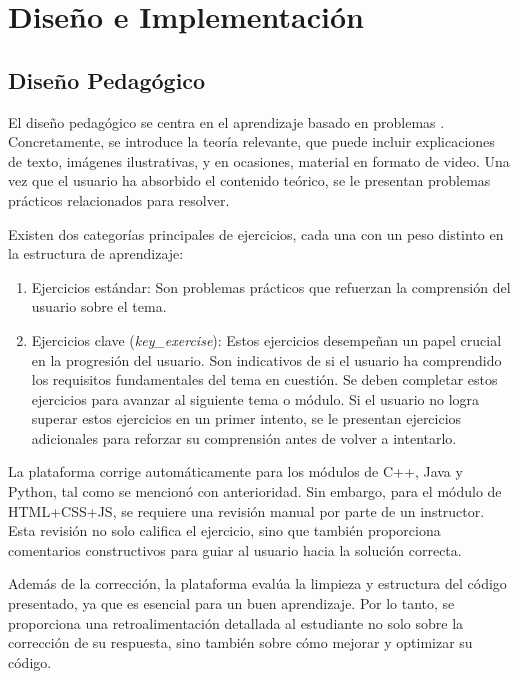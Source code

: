 \chapter{Diseño e Implementación} \label{chap:analisisExperimentación}


\section{Diseño Pedagógico}

El diseño pedagógico se centra en el aprendizaje basado en problemas \cite{de2008aprendizaje}. Concretamente, se introduce la teoría relevante, que puede incluir explicaciones de texto, imágenes ilustrativas, y en ocasiones, material en formato de video. Una vez que el usuario ha absorbido el contenido teórico, se le presentan problemas prácticos relacionados para resolver.

Existen dos categorías principales de ejercicios, cada una con un peso distinto en la estructura de aprendizaje:

\begin {enumerate}
\item Ejercicios estándar: Son problemas prácticos que refuerzan la comprensión del usuario sobre el tema.

\item Ejercicios clave (\textit{key\_exercise}): Estos ejercicios desempeñan un papel crucial en la progresión del usuario. Son indicativos de si el usuario ha comprendido los requisitos fundamentales del tema en cuestión. Se deben completar estos ejercicios para avanzar al siguiente tema o módulo. Si el usuario no logra superar estos ejercicios en un primer intento, se le presentan ejercicios adicionales para reforzar su comprensión antes de volver a intentarlo.
\end{enumerate}

La plataforma corrige automáticamente para los módulos de C++, Java y Python, tal como se mencionó con anterioridad. Sin embargo, para el módulo de HTML+CSS+JS, se requiere una revisión manual por parte de un instructor. Esta revisión no solo califica el ejercicio, sino que también proporciona comentarios constructivos para guiar al usuario hacia la solución correcta.

Además de la corrección, la plataforma evalúa la limpieza y estructura del código presentado, ya que es esencial para un buen aprendizaje. Por lo tanto, se proporciona una retroalimentación detallada al estudiante no solo sobre la corrección de su respuesta, sino también sobre cómo mejorar y optimizar su código.

